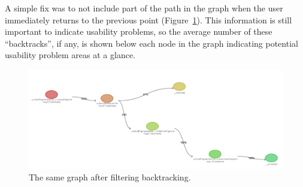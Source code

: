 A simple fix was to not include part of the path in the graph when the user immediately returns
to the previous point (Figure~\ref{fig:task-navigation-mess-fixed}). This information is still important to indicate usability problems, so the average number of these ``backtracks'', if any, is shown below each node in the graph indicating potential usability problem areas at a glance.

\begin{figure}[h]
 \centering
 \includegraphics[width=\textwidth]{images/fixed-graph}
 \caption{The same graph after filtering backtracking.}
 \label{fig:task-navigation-mess-fixed}
\end{figure}